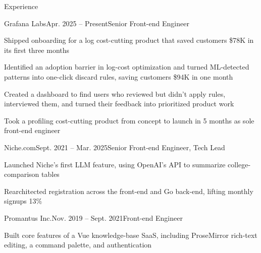 \documentclass{resume} %
\begin{document}
\begin{rSection}{Experience}

  \begin{rSubsection}{Grafana Labs}{Apr. 2025 – Present}{Senior Front-end Engineer}{}
    \item Shipped onboarding for a log cost-cutting product that saved customers \$78K in its first three months
    \item Identified an adoption barrier in log-cost optimization and turned ML-detected patterns into one-click discard rules, saving customers \$94K in one month
    \item Created a dashboard to find users who reviewed but didn't apply rules, interviewed them, and turned their feedback into prioritized product work
    \item Took a profiling cost-cutting product from concept to launch in 5 months as sole front-end engineer
  \end{rSubsection}

  \begin{rSubsection}{Niche.com}{Sept. 2021 – Mar. 2025}{Senior Front-end Engineer, Tech Lead}{}
    \item Launched Niche's first LLM feature, using OpenAI's API to summarize college-comparison tables
    \item Rearchitected registration across the front-end and Go back-end, lifting monthly signups 13\%
  \end{rSubsection}

  \begin{rSubsection}{Promantus Inc.}{Nov. 2019 – Sept. 2021}{Front-end Engineer}{}
    \item Built core features of a Vue knowledge-base SaaS, including ProseMirror rich-text editing, a command palette, and authentication
  \end{rSubsection}

\end{rSection}
\end{document}
